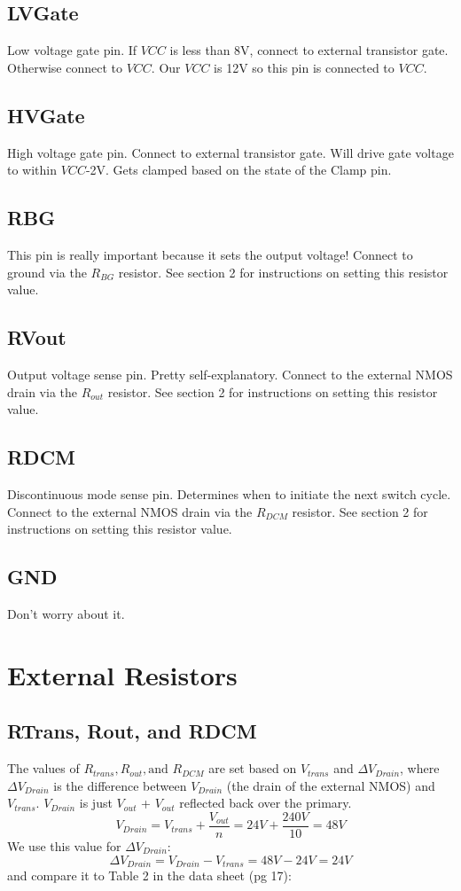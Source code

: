 \documentclass{article}
\begin{document}
	\subsection{LVGate}
	Low voltage gate pin. If $VCC$ is less than 8V, connect to external transistor gate. Otherwise connect to $VCC$. Our $VCC$ is 12V so this pin is connected to $VCC$. 
	
	\subsection{HVGate}
	High voltage gate pin. Connect to external transistor gate. Will drive gate voltage to within $VCC$-2V. Gets clamped based on the state of the Clamp pin.
	
	\subsection{RBG}
	This pin is really important because it sets the output voltage! Connect to ground via the $R_{BG}$ resistor. See section 2 for instructions on setting this resistor value.
	
	\subsection{RVout}
	Output voltage sense pin. Pretty self-explanatory. Connect to the external NMOS drain via the $R_{out}$ resistor. See section 2 for instructions on setting this resistor value.
	
	\subsection{RDCM}
	Discontinuous mode sense pin. Determines when to initiate the next switch cycle. Connect to the external NMOS drain via the $R_{DCM}$ resistor. See section 2 for instructions on setting this resistor value.
	
	\subsection{GND}
	Don't worry about it.
	
	\section{External Resistors}
	\subsection{RTrans, Rout, and RDCM}
	The values of $R_{trans}, R_{out}, \text{and } R_{DCM}$ are set based on $V_{trans}$ and $\Delta V_{Drain}$, where $\Delta V_{Drain}$ is the difference between $V_{Drain}$ (the drain of the external NMOS) and $V_{trans}$. $V_{Drain}$ is just $V_{out}$ + $V_{out}$ reflected back over the primary. 
	\[V_{Drain} = V_{trans} + \dfrac{V_{out}}{n} = 24V + \dfrac{240V}{10} = 48V\]
	We use this value for $\Delta V_{Drain}$:
	\[\Delta V_{Drain} = V_{Drain} - V_{trans} = 48V - 24V = 24V\]
	and compare it to Table 2 in the data sheet (pg 17):
	
\end{document}
